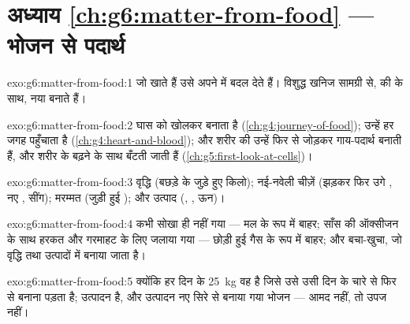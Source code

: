 \section*{अध्याय \ref{ch:g6:matter-from-food} --- भोजन से पदार्थ}

\begin{solution}{exo:g6:matter-from-food:1}
 जो  खाते हैं उसे अपने  में बदल
देते हैं।  विशुद्ध खनिज सामग्री से,  की  के साथ, नया
 बनाते हैं।
\end{solution}

\begin{solution}{exo:g6:matter-from-food:2}
 घास को खोलकर  बनाता है
(\cref{ch:g4:journey-of-food});  उन्हें हर जगह पहुँचाता है
(\cref{ch:g4:heart-and-blood}); और शरीर की  उन्हें फिर से
जोड़कर गाय-पदार्थ बनाती हैं, और शरीर के बढ़ने के साथ बँटती जाती हैं
(\cref{ch:g5:first-look-at-cells})।
\end{solution}

\begin{solution}{exo:g6:matter-from-food:3}
वृद्धि (बछड़े के जुड़े हुए किलो); नई-नवेली चीज़ें (झड़कर फिर उगे ,
नए , सींग); मरम्मत (जुड़ी हुई ); और उत्पाद (, , ऊन)।
\end{solution}

\begin{solution}{exo:g6:matter-from-food:4}
कभी सोखा ही नहीं गया --- मल के रूप में बाहर; साँस की ऑक्सीजन के साथ
हरकत और गरमाहट के लिए जलाया गया --- छोड़ी हुई गैस के रूप में बाहर; और
बचा-खुचा, जो वृद्धि तथा उत्पादों में बनाया जाता है।
\end{solution}

\begin{solution}{exo:g6:matter-from-food:5}
क्योंकि हर दिन के \qty{25}{kg}  वह  है जिसे उसे उसी
दिन के चारे से फिर से बनाना पड़ता है;  उत्पादन है, और उत्पादन नए
सिरे से बनाया गया भोजन --- आमद नहीं, तो उपज नहीं।
\end{solution}

